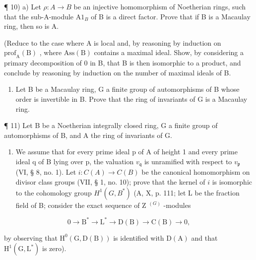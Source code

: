 ¶ 10) a) Let \(\rho: A \to B\) be an injective homomorphism of Noetherian rings, such that the sub-A-module \(\mathrm{A}1_{B}\) of B is a direct factor. Prove that if B is a Macaulay ring, then so is A.

(Reduce to the case where A is local and, by reasoning by induction on \(\mathrm{prof}_{\mathrm{A}}(\mathrm{B})\) , where \(\mathrm{Ass}(\mathrm{B})\) contains a maximal ideal. Show, by considering a primary decomposition of 0 in B, that B is then isomorphic to a product, and conclude by reasoning by induction on the number of maximal ideals of B.

\begin{enumerate}
\def\labelenumi{\alph{enumi})}
\setcounter{enumi}{1}
\tightlist
\item
  Let B be a Macaulay ring, G a finite group of automorphisms of B whose order is invertible in B. Prove that the ring of invariants of G is a Macaulay ring.
\end{enumerate}

¶ 11) Let B be a Noetherian integrally closed ring, G a finite group of automorphisms of B, and A the ring of invariants of G.

\begin{enumerate}
\def\labelenumi{\alph{enumi})}
\tightlist
\item
  We assume that for every prime ideal p of \(\mathrm{A}\) of height 1 and every prime ideal q of B lying over p, the valuation \(v_{\mathfrak{q}}\) is unramified with respect to \(v_{\mathfrak{p}}\) (VI, § 8, no. 1). Let \(i: C(A) \to C(B)\) be the canonical homomorphism on divisor class groups (VII, § 1, no. 10); prove that the kernel of \(i\) is isomorphic to the cohomology group \(H^{1}(G,B^{*})\) (A, X, p. 111; let L be the fraction field of B; consider the exact sequence of Z \(^{(G)}\) -modules
\end{enumerate}

\[
0 \rightarrow \mathrm{B} ^ {*} \rightarrow \mathrm{L} ^ {*} \rightarrow \mathrm{D} (\mathrm{B}) \rightarrow \mathrm{C} (\mathrm{B}) \rightarrow 0,
\]

by observing that \(\mathrm{H}^{0}(\mathrm{G},\mathrm{D}(\mathrm{B}))\) is identified with \(\mathrm{D}(\mathrm{A})\) and that \(\mathrm{H}^{1}(\mathrm{G},\mathrm{L}^{*})\) is zero).

